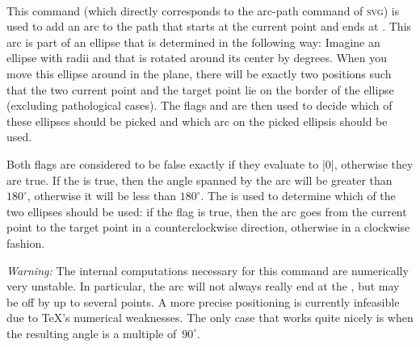 \begin{command}{\pgfpatharcto{}
    \\}
  This command (which directly corresponds to the arc-path command of
  \textsc{svg}) is used to add an arc to the path that starts at the
  current point and ends at . This arc is part of
  an ellipse that is determined in the following way: Imagine an
  ellipse with radii  and  that is
  rotated around its center by  degrees. When you move
  this ellipse around in the plane, there will be exactly two
  positions such that the two current point and the target point lie
  on the border of the ellipse (excluding pathological cases). The
  flags  and  are then used to
  decide which of these ellipses should be picked and which arc on the
  picked ellipsis should be used.
\begin{codeexample}[]
\end{codeexample}
  Both flags are considered to be false exactly if they evaluate to
  |0|, otherwise they are true. If the  is true,
  then the angle spanned by the arc will be greater than $180^\circ$,
  otherwise it will be less than $180^\circ$. The  is used to determine which of the two ellipses should be
  used: if the flag is true, then the arc goes from the current point
  to the target point in a counterclockwise direction, otherwise in a
  clockwise fashion.
\begin{codeexample}[]
\end{codeexample}
  \emph{Warning:} The internal computations necessary for this command
  are numerically very unstable. In particular, the arc will not
  always really end at the , but may be off by
  up to several points. A more precise positioning is currently
  infeasible due to \TeX's numerical weaknesses. The only case that
  works quite nicely is when the resulting angle is a multiple
  of~$90^\circ$.
\end{command}

